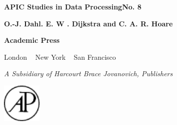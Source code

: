 \pagecolor{desertstorm}\afterpage{\nopagecolor}
{
	\color{shadesofmidnight}
	\selectfont
	\textbf{APIC Studies in Data Processing}\quad \textbf{No. 8}
	\vspace*{3em}
	
	\medskip
	
	\vspace*{3em}
	
	{
		\large
		\textbf{O.-J. Dahl. E. W . Dijkstra and C. A. R. Hoare}
	}
	
	\vfill
	
	 \begin{minipage}[position]{9cm}
	 	\vspace{-3em}
	 	
	 	\bfseries\Large Academic Press
	 	
	 	London ~ New York ~ San Francisco
	 	
	 	\normalfont\normalsize\sffamily
	 	\textit{A Subsidiary of Harcourt Brace Jovanovich, Publishers}
	\end{minipage}
	\hfill\includegraphics[width=0.14\textwidth]{./images/academic-press.pdf}
}
